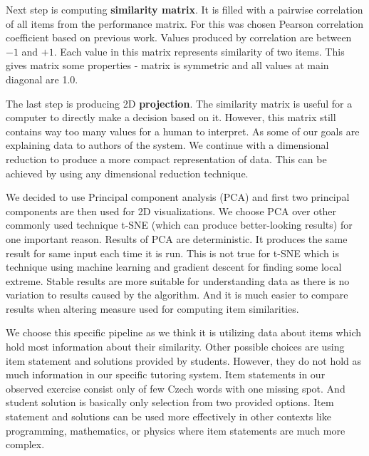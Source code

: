 \documentclass[
  digital, %
  table,   %
  nolof,     %
  nolot,     %
  nocover,
  color
]{fithesis3}
\begin{document}

Next step is computing \textbf{similarity matrix}. It is filled with a pairwise correlation of all items from the performance matrix. For this was chosen Pearson correlation coefficient based on previous work. Values produced by correlation are between $-1$ and $+1$. Each value in this matrix represents similarity of two items. This gives matrix some properties - matrix is symmetric and all values at main diagonal are 1.0.


The last step is producing 2D \textbf{projection}. The similarity matrix is useful for a computer to directly make a decision based on it. However, this matrix still contains way too many values for a human to interpret. As some of our goals are explaining data to authors of the system. We continue with a dimensional reduction to produce a more compact representation of data. This can be achieved by using any dimensional reduction technique.


We decided to use Principal component analysis (PCA) and first two principal components are then used for 2D visualizations. We choose PCA over other commonly used technique t-SNE (which can produce better-looking results) for one important reason. Results of PCA are deterministic. It produces the same result for same input each time it is run. This is not true for t-SNE which is technique using machine learning and gradient descent for finding some local extreme. Stable results are more suitable for understanding data as there is no variation to results caused by the algorithm. And it is much easier to compare results when altering measure used for computing item similarities.


We choose this specific pipeline as we think it is utilizing data about items which hold most information about their similarity. Other possible choices are using item statement and solutions provided by students. However, they do not hold as much information in our specific tutoring system. Item statements in our observed exercise consist only of few Czech words with one missing spot. And student solution is basically only selection from two provided options. Item statement and solutions can be used more effectively in other contexts like programming, mathematics, or physics where item statements are much more complex.
\end{document}
